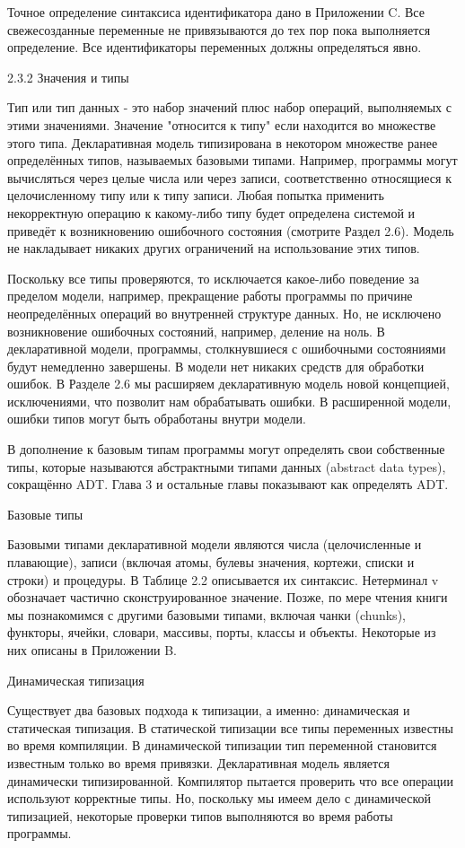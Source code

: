 Точное определение синтаксиса идентификатора дано в Приложении C. Все свежесозданные переменные не привязываются до тех пор пока выполняется определение. Все идентификаторы переменных должны определяться явно.

2.3.2 Значения и типы

Тип или тип данных - это набор значений плюс набор операций, выполняемых с этими значениями. Значение "относится к типу" если находится во множестве этого типа. Декларативная модель типизирована в некотором множестве ранее определённых типов, называемых базовыми типами. Например, программы могут вычисляться через целые числа или через записи, соответственно относящиеся к целочисленному типу или к типу записи. Любая попытка применить некорректную операцию к какому-либо типу будет определена системой и приведёт к возникновению ошибочного состояния (смотрите Раздел 2.6). Модель не накладывает никаких других ограничений на использование этих типов.

Поскольку все типы проверяются, то исключается какое-либо поведение за пределом модели, например, прекращение работы программы по причине неопределённых операций во внутренней структуре данных. Но, не исключено возникновение ошибочных состояний, например, деление на ноль. В декларативной модели, программы, столкнувшиеся с ошибочными состояниями будут немедленно завершены. В модели нет никаких средств для обработки ошибок. В Разделе 2.6 мы расширяем декларативную модель новой концепцией, исключениями, что позволит нам обрабатывать ошибки. В расширенной модели, ошибки типов могут быть обработаны внутри модели.

В дополнение к базовым типам программы могут определять свои собственные типы, которые называются абстрактными типами данных (abstract data types), сокращённо ADT. Глава 3 и остальные главы показывают как определять ADT.

Базовые типы

Базовыми типами декларативной модели являются числа (целочисленные и плавающие), записи (включая атомы, булевы значения, кортежи, списки и строки) и процедуры. В Таблице 2.2 описывается их синтаксис. Нетерминал v обозначает частично сконструированное значение. Позже, по мере чтения книги мы познакомимся с другими базовыми типами, включая чанки (chunks), функторы, ячейки, словари, массивы, порты, классы и объекты. Некоторые из них описаны в Приложении B.

Динамическая типизация

Существует два базовых подхода к типизации, а именно: динамическая и статическая типизация. В статической типизации все типы переменных известны во время компиляции. В динамической типизации тип переменной становится известным только во время привязки. Декларативная модель является динамически типизированной. Компилятор пытается проверить что все операции используют корректные типы. Но, поскольку мы имеем дело с динамической типизацией, некоторые проверки типов выполняются во время работы программы.


